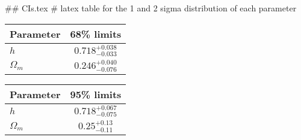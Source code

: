 ## CIs.tex
# latex table for the 1 and 2 sigma distribution of each parameter

\begin{tabular} { l  c}
 Parameter &  68\% limits\\
\hline
{\boldmath$h              $} & $0.718^{+0.038}_{-0.033}   $\\
{\boldmath$\Omega_m       $} & $0.246^{+0.040}_{-0.076}   $\\
\hline
\end{tabular}

\begin{tabular} { l  c}
 Parameter &  95\% limits\\
\hline
{\boldmath$h              $} & $0.718^{+0.067}_{-0.075}   $\\
{\boldmath$\Omega_m       $} & $0.25^{+0.13}_{-0.11}      $\\
\hline
\end{tabular}
